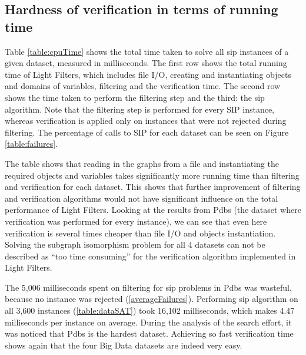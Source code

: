 \documentclass{l4proj}
\begin{document}
\subsection{Hardness of verification in terms of running time}
\label{subsec:hardnessVerifcTime}

Table \ref{table:cpuTime} shows the total time taken to solve all \gls{sip} instances of a given dataset, measured in milliseconds. The first row shows the total running time of Light Filters, which includes file I/O, creating and instantiating objects and domains of variables, filtering and the verification time. The second row shows the time taken to perform the filtering step and the third: the \gls{sip} algorithm. Note that the filtering step is performed for every SIP instance, whereas verification is applied only on instances that were not rejected during filtering. The percentage of calls to SIP for each dataset can be seen on Figure \ref{table:failures}.

The table shows that reading in the graphs from a file and instantiating the required objects and variables takes significantly more running time than filtering and verification for each dataset. 
This shows that further improvement of filtering and verification algorithms would not have significant influence on the total performance of Light Filters. Looking at the results from Pdbs (the dataset where verification was performed for every instance), we can see that even here verification is several times cheaper than file I/O and objects instantiation. Solving the subgraph isomorphism problem for all 4 datasets can not be described as ``too time consuming'' for the verification algorithm implemented in Light Filters.

The 5,006 milliseconds spent on filtering for \gls{sip} problems in Pdbs was wasteful, because no instance was rejected (\ref{averageFailures}). Performing \gls{sip} algorithm on all 3,600 instances (\ref{table:dataSAT}) took 16,102 milliseconds, which makes 4.47 milliseconds per instance on average. During the analysis of the search effort, it was noticed that Pdbs is the hardest dataset. Achieving so fast verification time shows again that the four Big Data datasets are indeed very easy.
\end{document}
